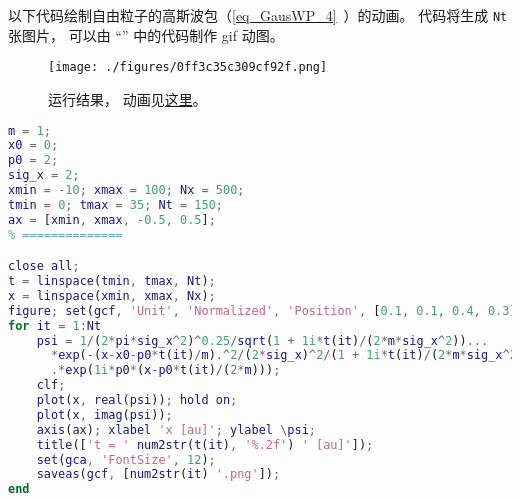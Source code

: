 
\begin{issues}
\issueDraft
\end{issues}


以下代码绘制自由粒子的高斯波包（\autoref{eq_GausWP_4}~）的动画。 代码将生成 \verb|Nt| 张图片， 可以由 “” 中的代码制作 gif 动图。

\begin{figure}[ht]
\centering
\texttt{[image: ./figures/0ff3c35c309cf92f.png]}
\caption{运行结果， 动画见\href{https://wuli.wiki/apps/free_gauss.html}{这里}。} \label{fig_FreeGs_1}
\end{figure}

\begin{lstlisting}[language=matlab, caption=free\_gauss.m]
% === 参数 (原子单位) ===
m = 1;
x0 = 0;
p0 = 2;
sig_x = 2;
xmin = -10; xmax = 100; Nx = 500;
tmin = 0; tmax = 35; Nt = 150;
ax = [xmin, xmax, -0.5, 0.5];
% ==============

close all;
t = linspace(tmin, tmax, Nt);
x = linspace(xmin, xmax, Nx);
figure; set(gcf, 'Unit', 'Normalized', 'Position', [0.1, 0.1, 0.4, 0.3]);
for it = 1:Nt
    psi = 1/(2*pi*sig_x^2)^0.25/sqrt(1 + 1i*t(it)/(2*m*sig_x^2))...
      *exp(-(x-x0-p0*t(it)/m).^2/(2*sig_x)^2/(1 + 1i*t(it)/(2*m*sig_x^2)))...
      .*exp(1i*p0*(x-p0*t(it)/(2*m)));
    clf;
    plot(x, real(psi)); hold on;
    plot(x, imag(psi));
    axis(ax); xlabel 'x [au]'; ylabel \psi;
    title(['t = ' num2str(t(it), '%.2f') ' [au]']);
    set(gca, 'FontSize', 12);
    saveas(gcf, [num2str(it) '.png']);
end
\end{lstlisting}
